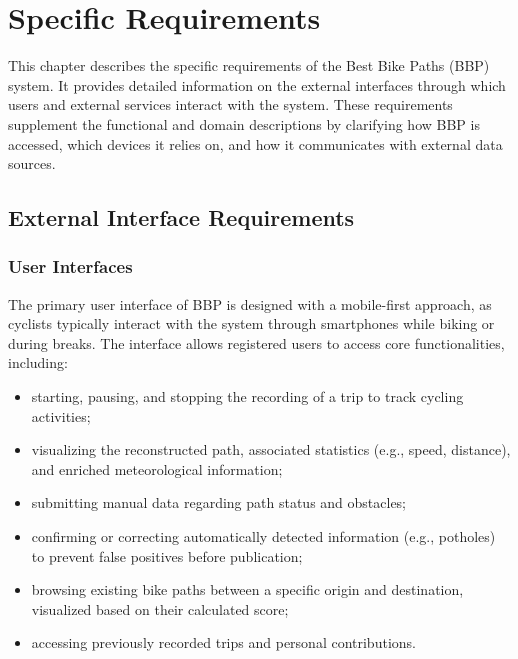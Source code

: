 \chapter{Specific Requirements}
\label{chap:specific-requirements}

\par This chapter describes the specific requirements of the Best Bike Paths (BBP) system. It provides detailed information on the external interfaces through which users and external services interact with the system. These requirements supplement the functional and domain descriptions by clarifying how BBP is accessed, which devices it relies on, and how it communicates with external data sources.

\section{External Interface Requirements}
\label{sec:external-interface-requirements}

\subsection{User Interfaces}
\label{subsec:user-interfaces}

\par The primary user interface of BBP is designed with a mobile-first approach, as cyclists typically interact with the system through smartphones while biking or during breaks. The interface allows registered users to access core functionalities, including:

\begin{itemize}
    \item starting, pausing, and stopping the recording of a trip to track cycling activities;
    \item visualizing the reconstructed path, associated statistics (e.g., speed, distance), and enriched meteorological information;
    \item submitting manual data regarding path status and obstacles;
    \item confirming or correcting automatically detected information (e.g., potholes) to prevent false positives before publication;
    \item browsing existing bike paths between a specific origin and destination, visualized based on their calculated score;
    \item accessing previously recorded trips and personal contributions.
\end{itemize}

